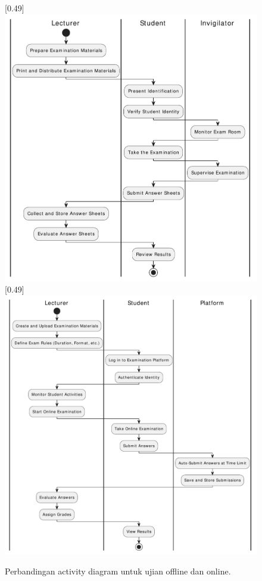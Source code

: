 \begin{figure}[th!]
	\centering
	[0.49\linewidth]{\includegraphics[width=\linewidth]{../figures/activity_offline_exam}}
	\hfill
	[0.49\linewidth]{\includegraphics[width=\linewidth]{../figures/activity_online_exam}}
	\caption{Perbandingan activity diagram untuk ujian offline dan online.}
\end{figure}

